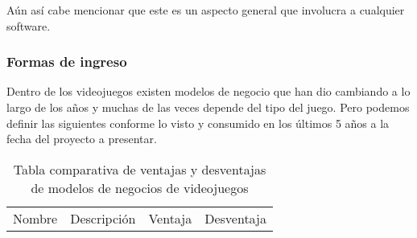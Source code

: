 Aún así cabe mencionar que este es un aspecto general que involucra a cualquier software.

\subsubsection{Formas de ingreso}
Dentro de los videojuegos existen modelos de negocio que han dio cambiando a lo largo de los años y muchas de las veces depende del tipo del juego. Pero podemos definir las siguientes conforme lo visto y consumido en los últimos 5 años a la fecha del proyecto a presentar.

\begin{table}[htbp]
	\centering
	\caption{Tabla comparativa de ventajas y desventajas de modelos de negocios de videojuegos}
	\label{tablaMoneVJ}
	\begin{tabular}{llll}
		Nombre       & Descripción                                                                                                               & Ventaja                                                                                                                                                                                                                                                                                                                  & Desventaja                                                                                                                                                                                                                                                                                                                                                                            \\

\end{tabular}
\end{table}
